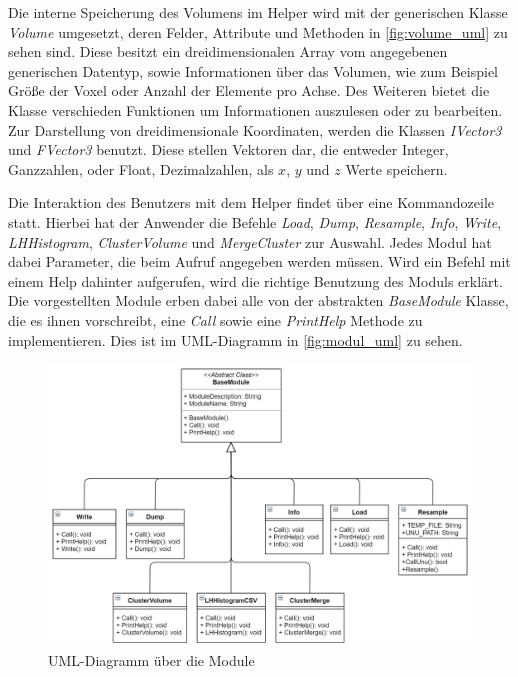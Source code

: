 Die interne Speicherung des Volumens im Helper wird mit der generischen Klasse \textit{Volume} umgesetzt, deren Felder, Attribute und Methoden in \autoref{fig:volume_uml} zu sehen sind. Diese besitzt ein dreidimensionalen Array vom angegebenen generischen Datentyp, sowie Informationen über das Volumen, wie zum Beispiel Größe der Voxel oder Anzahl der Elemente pro Achse.
Des Weiteren bietet die Klasse verschieden Funktionen um Informationen auszulesen oder zu bearbeiten. Zur Darstellung von dreidimensionale Koordinaten, werden die Klassen \textit{IVector3} und \textit{FVector3} benutzt. Diese stellen Vektoren dar, die entweder Integer, Ganzzahlen, oder Float, Dezimalzahlen, als $x$, $y$ und $z$ Werte speichern.


Die Interaktion des Benutzers mit dem Helper findet über eine Kommandozeile statt. Hierbei hat der Anwender die Befehle \textit{Load}, \textit{Dump}, \textit{Resample}, \textit{Info}, \textit{Write}, \textit{LHHistogram}, \textit{ClusterVolume} und \textit{MergeCluster} zur Auswahl. Jedes Modul hat dabei Parameter, die beim Aufruf angegeben werden müssen. Wird ein Befehl mit einem Help dahinter aufgerufen, wird die richtige Benutzung des Moduls erklärt.
Die vorgestellten Module erben dabei alle von der abstrakten \textit{BaseModule} Klasse, die es ihnen vorschreibt, eine \textit{Call} sowie eine \textit{PrintHelp} Methode zu implementieren. Dies ist im UML-Diagramm in \autoref{fig:modul_uml} zu sehen.


\begin{figure}
\centering 
\includegraphics[width=\textwidth]{Logos/Modules_UML.PNG}
\caption{UML-Diagramm über die Module} 
\label{fig:modul_uml} 
\end{figure}


